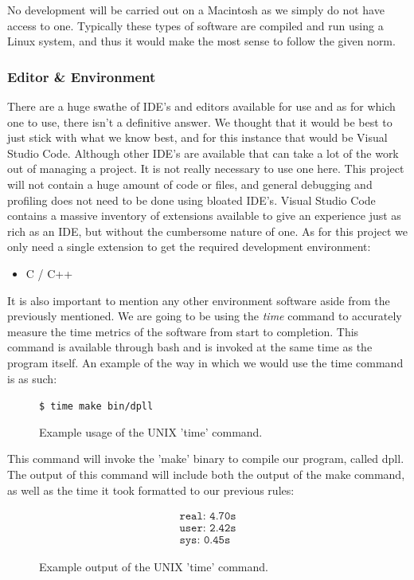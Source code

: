 \documentclass{article}
\begin{document}
No development will be carried out on a Macintosh as we simply do not have access to one. Typically these types of software are
compiled and run using a Linux system, and thus it would make the most sense to follow the given norm.

\subsubsection{Editor \& Environment}
There are a huge swathe of IDE's and editors available for use and as for which one to use, there isn't a definitive answer. We
thought that it would be best to just stick with what we know best, and for this instance that would be Visual Studio Code.
Although other IDE's are available that can take a lot of the work out of managing a project. It is not really necessary to use
one here. This project will not contain a huge amount of code or files, and general debugging and profiling does not need to be
done using bloated IDE's. Visual Studio Code contains a massive inventory of extensions available to give an experience just as
rich as an IDE, but without the cumbersome nature of one. As for this project we only need a single extension to get the required
development environment:

\begin{itemize}
    \item C / C++
\end{itemize}

It is also important to mention any other environment software aside from the previously mentioned. We are going to be using the
\textit{time} command to accurately measure the time metrics of the software from start to completion. This command is available
through bash and is invoked at the same time as the program itself. An example of the way in which we would use the time command
is as such:

\begin{figure}[h]
    \centering
    \texttt{\$ time make bin/dpll}
    \caption{Example usage of the UNIX 'time' command.}
\end{figure}

This command will invoke the 'make' binary to compile our program, called dpll. The output of this command will include both the
output of the make command, as well as the time it took formatted to our previous rules:

\begin{figure}[h]
    \centering
    \begin{align*}
        \texttt{real: 4.70s} \\
        \texttt{user: 2.42s} \\
        \texttt{sys: 0.45s}
    \end{align*}
    \caption{Example output of the UNIX 'time' command.}
\end{figure}
\end{document}
